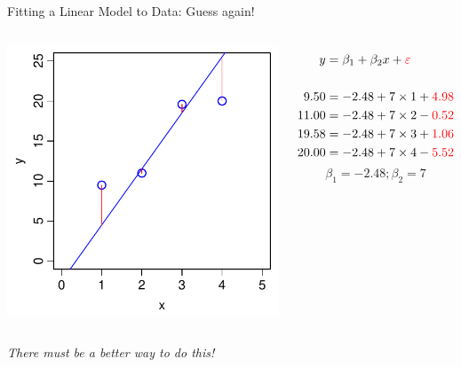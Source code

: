 \documentclass[xcolor=x11names,compress]{beamer}
\renewcommand{\(}{\begin{columns}}
\renewcommand{\)}{\end{columns}}
\newcommand{\<}[1]{\begin{column}{#1}}
\renewcommand{\>}{\end{column}}
\begin{document}

\begin{frame}{Fitting a Linear Model to Data: Guess again!}
    \begin{columns}[T]

		\includegraphics[width=\textwidth]{TooSteep.pdf}
		
		\begin{align*}
		  y  &= \beta_1 + \beta_2 x + {\color{red} \varepsilon }\\
		  \\
		  9.50  &= -2.48 + 7 \times 1 + {\color{red} 4.98}\\
		  11.00 &= -2.48 + 7 \times 2 - {\color{red} 0.52}\\
		  19.58 &= -2.48 + 7 \times 3 + {\color{red} 1.06}\\
		  20.00 &= -2.48 + 7 \times 4 - {\color{red} 5.52} 
		\end{align*}
		\[\beta_1 = -2.48; \beta_2=7\]

\end{columns}		
\pause
\begin{center}
    {\it There must be a better way to do this!}
\end{center}

\end{frame}
\end{document}
